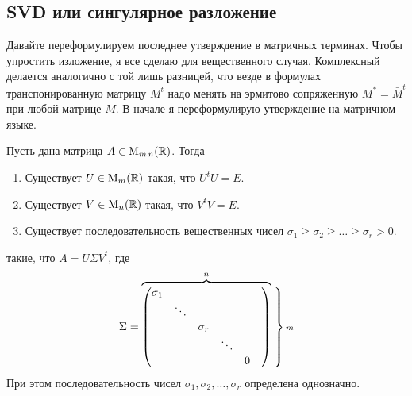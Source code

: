 \subsection{SVD или сингулярное разложение}

Давайте переформулируем последнее утверждение в матричных терминах. Чтобы упростить изложение, я все сделаю для вещественного случая. Комплексный делается аналогично с той лишь разницей, что везде в формулах транспонированную матрицу $M^t$ надо менять на эрмитово сопряженную $M^* = \bar M^t$ при любой матрице $M$. В начале я переформулирую утверждение на матричном языке.

\begin{claim}
Пусть дана матрица $A\in \operatorname{M}_{m\,n}(\mathbb R)$. Тогда \begin{enumerate}
\item Существует $U\in \operatorname{M}_{m}(\mathbb R)$ такая, что $U^t U = E$.
\item Существует $V\in \operatorname{M}_{n}(\mathbb R)$ такая, что $V^t V = E$.
\item Существует последовательность вещественных чисел $\sigma_1\geqslant \sigma_2\geqslant \ldots\geqslant \sigma_r > 0$.
\end{enumerate}
такие, что $A = U \Sigma V^t$, где
\[
\Sigma =
\overbrace{
\begin{pmatrix}
{\sigma_1}&{}&{}&{}&{}&{}\\
{}&{\ddots}&{}&{}&{}&{}\\
{}&{}&{\sigma_r}&{}&{}&{}\\
{}&{}&{}&{\ddots}&{}&{}\\
{}&{}&{}&{}&{0}&{}\\
\end{pmatrix}
}^n
\left.
\vphantom{
\begin{pmatrix}
{\sigma_1}&{}&{}&{}&{}&{}\\
{}&{\ddots}&{}&{}&{}&{}\\
{}&{}&{\sigma_r}&{}&{}&{}\\
{}&{}&{}&{\ddots}&{}&{}\\
{}&{}&{}&{}&{0}&{}\\
\end{pmatrix}
}
\right\}{\scriptstyle m}
\]
При этом последовательность чисел $\sigma_1,\sigma_2,\ldots,\sigma_r$ определена однозначно.
\end{claim}

